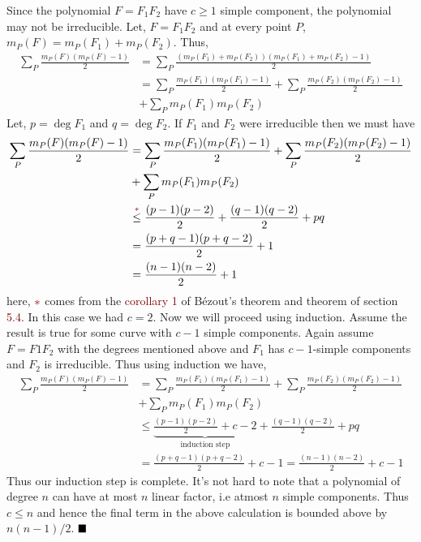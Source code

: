 \documentclass[12pt]{article}
\begin{document}
Since the polynomial $F=F_1F_2$ have $c\geq 1$ simple component, the polynomial may not be irreducible. Let, $F=F_1F_2$ and at every point $P$, $m_P(F)= m_P(F_1)+m_P(F_2)$. Thus, \begin{align*}
   \sum_P \frac{m_P(F)(m_P(F)-1)}{2} &= \sum_{P} \frac{(m_P(F_1)+m_P(F_2))(m_P(F_1)+m_P(F_2)-1)}{2} \\
   &= \sum_{P} \frac{m_P(F_1)(m_P(F_1)-1)}{2} + \sum_{P} \frac{m_P(F_2)(m_P(F_2)-1)}{2}  \\&+ \sum_{P}m_P(F_1)m_P(F_2)
\end{align*}
Let, $p = \deg F_1$ and $q = \deg F_2$. If $F_1$ and $F_2$ were irreducible then we must have \begin{align*}
   \sum_P \frac{m_P(F)(m_P(F)-1)}{2} 
   &= \sum_{P} \frac{m_P(F_1)(m_P(F_1)-1)}{2} + \sum_{P} \frac{m_P(F_2)(m_P(F_2)-1)}{2}  \\&+ \sum_{P}m_P(F_1)m_P(F_2) \\
   &\overset{\textcolor{maroon}{\ast}}{\leq} \frac{(p-1)(p-2)}{2}+\frac{(q-1)(q-2)}{2} + pq \\
   &= \frac{(p+q-1)(p+q-2)}{2} +1 \\
   &= \frac{(n-1)(n-2)}{2}+1
\end{align*}
here, $\textcolor{maroon}{\ast}$ comes from the \textcolor{maroon}{corollary 1} of B\'ezout's theorem and theorem of section \textcolor{maroon}{5.4}. In this case we had $c=2$. Now we will proceed using induction. Assume the result is true for some curve with $c-1$ simple components. Again assume $F=F1F_2$ with the degrees mentioned above and $F_1$ has $c-1$-simple components and $F_2$ is irreducible. Thus using induction we have, 
\begin{align*}
   \sum_P \frac{m_P(F)(m_P(F)-1)}{2} 
   &= \sum_{P} \frac{m_P(F_1)(m_P(F_1)-1)}{2} + \sum_{P} \frac{m_P(F_2)(m_P(F_2)-1)}{2}  \\&+ \sum_{P}m_P(F_1)m_P(F_2)\\
   & \leq \underbrace{\frac{(p-1)(p-2)}{2}+c-2}_{\text{induction step}}+\frac{(q-1)(q-2)}{2} + pq\\
   &= \frac{(p+q-1)(p+q-2)}{2} +c-1 = \frac{(n-1)(n-2)}{2}+c-1
\end{align*}
Thus our induction step is complete. It's not hard to note that a polynomial of degree $n$ can have at most $n$ linear factor, i.e atmost $n$ simple components. Thus $c \leq n$ and hence the final term in the above calculation is bounded above by $n(n-1)/2$. $\hfill\blacksquare$
\end{document}
